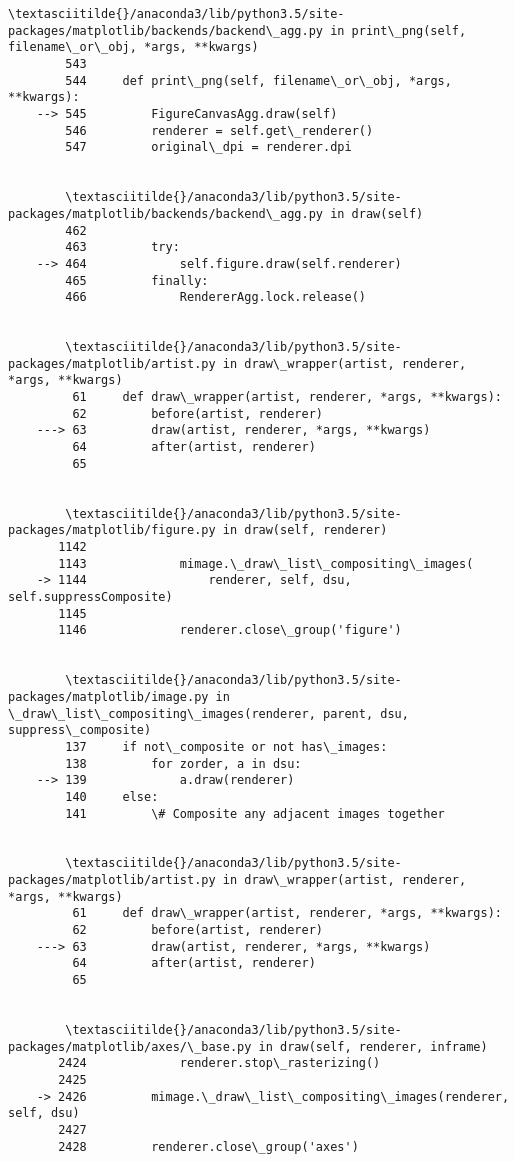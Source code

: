 \documentclass[11pt]{article}
\begin{document}
\begin{Verbatim}[commandchars=\\\{\}]
        \textasciitilde{}/anaconda3/lib/python3.5/site-packages/matplotlib/backends/backend\_agg.py in print\_png(self, filename\_or\_obj, *args, **kwargs)
        543 
        544     def print\_png(self, filename\_or\_obj, *args, **kwargs):
    --> 545         FigureCanvasAgg.draw(self)
        546         renderer = self.get\_renderer()
        547         original\_dpi = renderer.dpi


        \textasciitilde{}/anaconda3/lib/python3.5/site-packages/matplotlib/backends/backend\_agg.py in draw(self)
        462 
        463         try:
    --> 464             self.figure.draw(self.renderer)
        465         finally:
        466             RendererAgg.lock.release()


        \textasciitilde{}/anaconda3/lib/python3.5/site-packages/matplotlib/artist.py in draw\_wrapper(artist, renderer, *args, **kwargs)
         61     def draw\_wrapper(artist, renderer, *args, **kwargs):
         62         before(artist, renderer)
    ---> 63         draw(artist, renderer, *args, **kwargs)
         64         after(artist, renderer)
         65 


        \textasciitilde{}/anaconda3/lib/python3.5/site-packages/matplotlib/figure.py in draw(self, renderer)
       1142 
       1143             mimage.\_draw\_list\_compositing\_images(
    -> 1144                 renderer, self, dsu, self.suppressComposite)
       1145 
       1146             renderer.close\_group('figure')


        \textasciitilde{}/anaconda3/lib/python3.5/site-packages/matplotlib/image.py in \_draw\_list\_compositing\_images(renderer, parent, dsu, suppress\_composite)
        137     if not\_composite or not has\_images:
        138         for zorder, a in dsu:
    --> 139             a.draw(renderer)
        140     else:
        141         \# Composite any adjacent images together


        \textasciitilde{}/anaconda3/lib/python3.5/site-packages/matplotlib/artist.py in draw\_wrapper(artist, renderer, *args, **kwargs)
         61     def draw\_wrapper(artist, renderer, *args, **kwargs):
         62         before(artist, renderer)
    ---> 63         draw(artist, renderer, *args, **kwargs)
         64         after(artist, renderer)
         65 


        \textasciitilde{}/anaconda3/lib/python3.5/site-packages/matplotlib/axes/\_base.py in draw(self, renderer, inframe)
       2424             renderer.stop\_rasterizing()
       2425 
    -> 2426         mimage.\_draw\_list\_compositing\_images(renderer, self, dsu)
       2427 
       2428         renderer.close\_group('axes')



\end{Verbatim}
\end{document}
